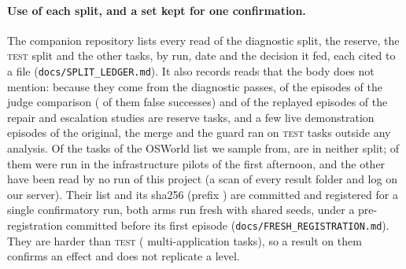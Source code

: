 \paragraph{Use of each split, and a set kept for one confirmation.} The companion repository lists every read of the diagnostic split, the reserve, the \textsc{test} split and the other tasks, by run, date and the decision it fed, each cited to a file (\texttt{docs/SPLIT\_LEDGER.md}). It also records reads that the body does not mention: because they come from the diagnostic passes, \exReserveJudge{} of the \gbEpisodes{} episodes of the judge comparison (\exReserveJudgeFalse{} of them false successes) and \exReserveRescue{} of the \rbAllEpisodes{} replayed episodes of the repair and escalation studies are reserve tasks, and a few live demonstration episodes of the original, the merge and the guard ran on \textsc{test} tasks outside any analysis. Of the \exFreshAll{} tasks of the OSWorld list we sample from, \exFreshUnsplit{} are in neither split; \exFreshPilot{} of them were run in the infrastructure pilots of the first afternoon, and the other \exFreshN{} have been read by no run of this project (a scan of every result folder and log on our server). Their list and its sha256 (prefix \texttt{\exFreshSha}) are committed and registered for a single confirmatory run, both arms run fresh with shared seeds, under a pre-registration committed before its first episode (\texttt{docs/FRESH\_REGISTRATION.md}). They are harder than \textsc{test} (\exFreshMulti{} multi-application tasks), so a result on them confirms an effect and does not replicate a level. %
